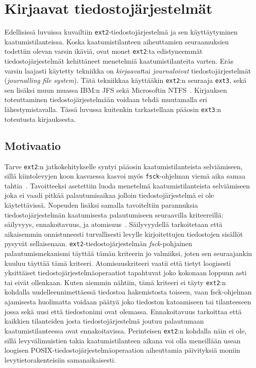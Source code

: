 \section{Kirjaavat tiedostojärjestelmät}
\label{ChapJournallingFs}
Edellisissä luvuissa kuvailtiin \texttt{ext2}-tiedostojärjestelmä ja sen käyttäytyminen kaatumistilanteissa.
Koska kaatumistilanteen aiheuttamien seuraamuksien todettiin olevan varsin ikäviä,
ovat monet \texttt{ext2}:ta edistyneemmät tiedostojärjestelmät kehittäneet menetelmiä kaatumistilanteita varten.
Eräs varsin laajasti käytetty tekniikka on \emph{kirjaavat}tai \emph{journaloivat} tiedostojärjestelmät (\emph{journalling file system}).
Tätä tekniikkaa käyttääkin \texttt{ext2}:n seuraaja \texttt{ext3}, sekä sen lisäksi
muun muassa IBM:n JFS sekä Microsoftin NTFS~\cite{JournalingAnalysis}.
Kirjauksen toteuttaminen tiedostojärjestelmään voidaan tehdä muutamalla eri lähestymistavalla.
Tässä luvussa kuitenkin tarkastellaan pääosin \texttt{ext3}:n toteutusta kirjauksesta.

\subsection{Motivaatio}

Tarve \texttt{ext2}:n jatkokehitykselle syntyi pääosin kaatumistilanteista selviämiseen,
sillä kiintolevyjen koon kasvaessa kasvoi myös \texttt{fsck}-ohjelman viemä aika samaa tahtia~\cite{Ext2Journal}.
Tavoitteeksi asetettiin luoda menetelmä kaatumistilanteista selviämiseen joka ei vaadi pitkää palautumisaikaa jolloin tiedostojärjestelmä ei ole käytettävissä.
Nopeuden lisäksi samalla tavoiteltiin parannuksia tiedostojärjestelmän kaatumisesta palautumiseen seuraavilla kriteereillä: säilyvyys, ennakoitavuus, ja atomisuus~\cite{Ext2Journal}.
Säilyvyydellä tarkoitetaan että aikaisemmin onnistuneesti turvallisesti levylle kirjoitettujen tiedostojen sisällöt pysyvät sellaisenaan.
\texttt{ext2}-tiedostojärjestelmän \emph{fsck}-pohjainen palautumismekanismi täyttää tämän kriteerin jo valmiiksi,
joten sen seuraajankin kuuluu täyttää tämä kriteeri.
Atomisuuskriteeri vaatii että tietyt loogisesti yksittäiset tiedostojärjestelmäoperaatiot tapahtuvat
joko kokonaan loppuun asti tai eivät ollenkaan.
Kuten aiemmin nähtiin, tämä kriteeri ei täyty \texttt{ext2}:n kohdalla uudelleennimettäessä tiedostoa hakemistosta toiseen,
vaan fsck-ohjelman ajamisesta huolimatta voidaan päätyä joko tiedoston katoamiseen tai tilanteeseen jossa sekä uusi että tiedostonimi ovat olemassa.
Ennakoitavuus tarkoittaa että kaikkien tilanteiden josta tiedostojärjestelmä joutuu palautumaan kaatumistilanteessa ovat ennakoitavissa.
Perinteisen \texttt{ext2}:n kohdalla näin ei ole,
sillä levyvälimuistien takia kaatumistilanteen aikana voi olla meneillään usean loogisen POSIX-tiedostojärjestelmäoperaation aiheuttamia päivityksiä moniin levytietorakenteisiin samanaikaisesti.

